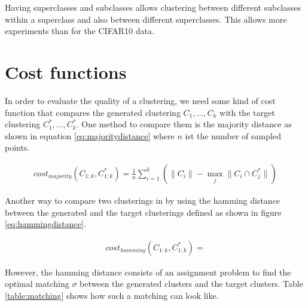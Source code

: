 Having superclasses and subclasses allows clustering between different subclasses within a superclass and also between different superclasses. This allows more experiments than for the CIFAR10 data.

\section{Cost functions}

In order to evaluate the quality of a clustering, we need some kind of cost function that compares the generated clustering $C_1,...,C_k$ with the target clustering $C_1^*, ..., C_k^*$. One method to compare them is the majority distance as shown in equation \ref{eq:majoritydistance} where $n$ ist the number of sampled points.

\begin{equation}
    \begin{aligned}
        cost_{majority}(C_{1:k}, C_{1:k}^*) = \frac{1}{n} \sum\limits_{i=1}^{k} (\|C_i\| - \max\limits_j \|C_i \cap C_j^*\|)
    \end{aligned}
    \label{eq:majoritydistance}
\end{equation}

Another way to compare two clusterings in by using the hamming distance between the generated and the target clusterings defined as shown in figure \ref{eq:hammingdistance}.

\begin{equation}
    \begin{aligned}
        cost_{hamming}(C_{1:k}, C_{1:k}^*) = 
    \end{aligned}
    \label{eq:hammingdistance}
\end{equation}

However, the hamming distance consists of an assignment problem to find the optimal matching $\sigma$ between the generated clusters and the target clusters. Table \ref{table:matching} shows how such a matching can look like.

